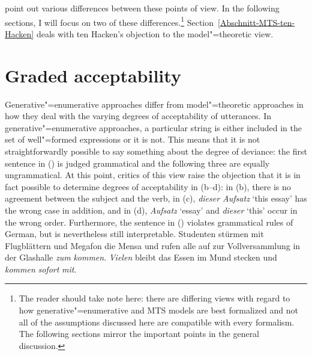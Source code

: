\citet{PS2001a} point out various differences between these points of view. In the following sections, I will focus on two of these differences.\footnote{
	The reader should take note here: there are differing views with regard to how generative"=enumerative and MTS models are best formalized and not
	all of the assumptions discussed here are compatible with every formalism. The following sections mirror the important points in the general discussion.%
} Section~\ref{Abschnitt-MTS-ten-Hacken} deals with ten Hacken's objection to the model"=theoretic view.

\section{Graded acceptability}

Generative"=enumerative approaches differ from model"=theoretic approaches in how they deal with the varying degrees of acceptability
of utterances. In generative"=enumerative approaches, a particular string is either included in the set of well"=formed expressions or it is not.
This means that it is not straightforwardly possible to say something about the degree of deviance: the first sentence in () is judged grammatical
and the following three are equally ungrammatical.
\eal
{}
\zl
At this point, critics of this view raise the objection that it is in fact possible to determine degrees of acceptability
in (b--d): in (b), there is no agreement between the subject and the verb, in
(c),  \emph{dieser Aufsatz} `this essay'  has the wrong case in addition, and in (d),
\emph{Aufsatz} `essay' and \emph{dieser} `this' occur in the wrong order. Furthermore,
 the sentence in () violates grammatical rules of German, but is nevertheless still interpretable.
\ea
\gll Studenten stürmen mit Flugblättern und Megafon die Mensa und rufen alle auf zur Vollversammlung in der Glashalle \emph{zum} \emph{kommen}. \emph{Vielen} bleibt das Essen im Mund stecken und \emph{kommen} \emph{sofort} \emph{mit}.\footnotemark\\
